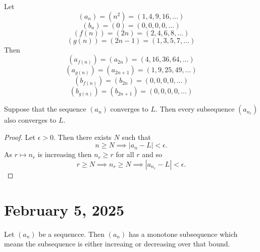 \documentclass[11pt]{article}
\begin{document}
\begin{example}\label{2.4.3}
    Let
    \[
        (a_n) = \left( n^2 \right) = (1, 4, 9, 16, \ldots)
    \]
    \[
        (b_n) = (0) = (0, 0, 0, 0, \ldots)
    \]
    \[
        (f(n)) = (2n) = (2, 4, 6, 8, \ldots)
    \]
    \[
        (g(n)) = (2n - 1) = (1, 3, 5, 7, \ldots)
    \]
    Then
    \[
        (a_{f(n)}) = (a_{2n}) = (4, 16, 36, 64, \ldots)
    \]
    \[
        (a_{g(n)}) = (a_{2n+1}) = (1, 9, 25, 49, \ldots)
    \]
    \[
        (b_{f(n)}) = (b_{2n}) = (0, 0, 0, 0, \ldots)
    \]
    \[
        (b_{g(n)}) = (b_{2n+1}) = (0, 0, 0, 0, \ldots)
    \]
\end{example}

\begin{proposition}\label{2.4.4}
    Suppose that the sequence $(a_n)$ converges to $L$. Then every subsequence $(a_{n_r})$ also converges to $L$.
\end{proposition}

\begin{proof}
    Let $\epsilon > 0$. Then there exists $N$ such that
    \[
        n \geq N \implies |a_n - L| < \epsilon.
    \]
    As $r \mapsto n_r$ is increasing then $n_r \geq r$ for all $r$ and so
    \[
        r \geq N \implies n_r \geq N \implies |a_{n_r} - L| < \epsilon.
    \]
\end{proof}
\section{February 5, 2025}
\begin{theorem}\label{2.4.5}
    Let \((a_n)\) be a sequencce. Then \((a_n)\) has a monotone subsequence which means the subsequence is either increaing or decreasing over that bound.
\end{theorem}
\begin{definition}

\end{definition}
\begin{center}
\end{center}
\end{document}
